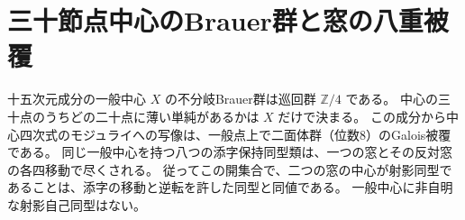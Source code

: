 \section{三十節点中心のBrauer群と窓の八重被覆}
\label{sec:thirty-node-dihedral-cover}
\begin{theorem}\label{thm:thirty-node-dihedral-cover}
十五次元成分の一般中心 $X$ の不分岐Brauer群は巡回群 $\mathbb Z/4$ である。
中心の三十点のうちどの二十点に薄い単純があるかは $X$ だけで決まる。
この成分から中心四次式のモジュライへの写像は、一般点上で二面体群（位数8）のGalois被覆である。
同じ一般中心を持つ八つの添字保持同型類は、一つの窓とその反対窓の各四移動で尽くされる。
従ってこの開集合で、二つの窓の中心が射影同型であることは、添字の移動と逆転を許した同型と同値である。
一般中心に非自明な射影自己同型はない。
\end{theorem}

